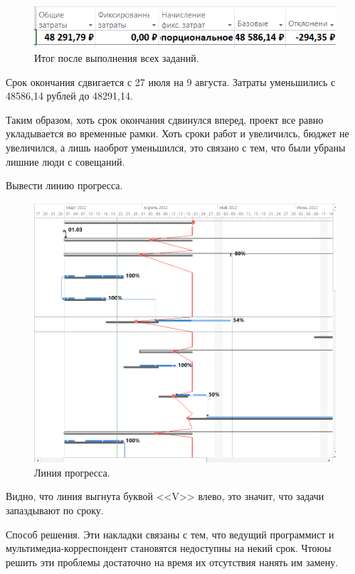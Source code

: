 \documentclass[a4paper,14pt]{extreport} %
\begin{document}
\begin{enumerate}
\begin{figure}[H]
	\centering
	\caption{Итог после выполнения всех заданий. }
	\includegraphics[scale=0.8]{result3}
\end{figure}
Срок окончания сдвигается с 27 июля на 9 августа. Затраты уменьшились с 48586,14 рублей до 48291,14.

Таким образом, хоть срок окончания сдвинулся вперед, проект все равно укладывается во временные рамки. Хоть сроки работ и увеличилсь, бюджет не увеличился, а лишь наоброт уменьшился, это связано с тем, что были убраны лишние люди с совещаний.

\newpage
Вывести линию прогресса.
\begin{figure}[H]
	\centering
	\caption{Линия прогресса. }
	\includegraphics[scale=0.8]{progress}
\end{figure}
Видно, что линия выгнута буквой <<V>> влево, это значит, что задачи запаздывают по сроку.

Способ решения. Эти накладки связаны с тем, что ведущий программист и мультимедиа-корреспондент становятся недоступны на некий срок. Чтоюы решить эти проблемы достаточно на время их отсутствия нанять им замену.

\end{enumerate}
\end{document}
